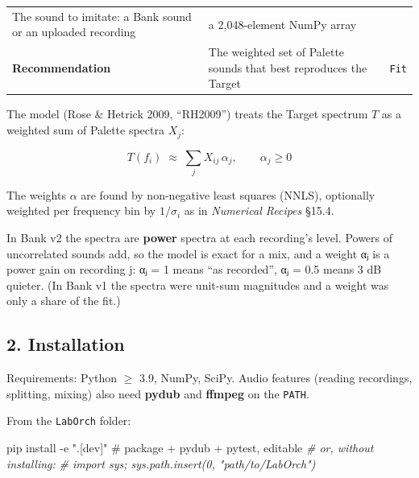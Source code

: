 \documentclass[
  10pt,
]{article}
\newenvironment{Shaded}{\begin{snugshade}}{\end{snugshade}}
\newcommand{\CommentTok}[1]{\textcolor[rgb]{0.56,0.35,0.01}{\textit{#1}}}
\newcommand{\ExtensionTok}[1]{#1}
\newcommand{\NormalTok}[1]{#1}
\newcommand{\StringTok}[1]{\textcolor[rgb]{0.31,0.60,0.02}{#1}}
\begin{document}
\begin{longtable}[]{@{}lll@{}}
\begin{minipage}[t]{0.30\columnwidth}\raggedright
The sound to imitate: a Bank sound or an uploaded
recording\strut
\end{minipage} &
\begin{minipage}[t]{0.30\columnwidth}\raggedright
a 2,048-element NumPy array\strut
\end{minipage}\tabularnewline
\begin{minipage}[t]{0.30\columnwidth}\raggedright
\textbf{Recommendation}\strut
\end{minipage} &
\begin{minipage}[t]{0.30\columnwidth}\raggedright
The weighted set of Palette sounds that best reproduces the
Target\strut
\end{minipage} &
\begin{minipage}[t]{0.30\columnwidth}\raggedright
\texttt{Fit}\strut
\end{minipage}\tabularnewline
\bottomrule
\end{longtable}

The model (Rose \& Hetrick 2009, ``RH2009'') treats the
Target spectrum $T$ as a weighted sum of Palette
spectra $X_j$:

\[
  T(f_i) \;\approx\; \sum_j X_{ij}\,\alpha_j, \qquad \alpha_j \ge 0
\]

The weights $\alpha$ are found by non-negative least squares
(NNLS), optionally weighted per frequency bin by $1/\sigma_i$ as in
\emph{Numerical Recipes} §15.4.

In Bank v2 the spectra are \textbf{power} spectra at each
recording's level. Powers of uncorrelated sounds add, so the
model is exact for a mix, and a weight αⱼ is a power gain on
recording j: αⱼ = 1 means ``as recorded'', αⱼ = 0.5 means 3
dB quieter. (In Bank v1 the spectra were unit-sum magnitudes
and a weight was only a share of the fit.)

\subsection{2. Installation}

Requirements: Python $\ge$ 3.9, NumPy, SciPy. Audio features
(reading recordings, splitting, mixing) also need
\textbf{pydub} and \textbf{ffmpeg} on the \texttt{PATH}.

From the \texttt{LabOrch} folder:

\begin{Shaded}
\begin{Highlighting}[]
\ExtensionTok{pip}\NormalTok{ install {-}e }\StringTok{".[dev]"}\NormalTok{     \# package + pydub + pytest, editable}
\CommentTok{\# or, without installing:}
\CommentTok{\#   import sys; sys.path.insert(0, "path/to/LabOrch")}
\end{Highlighting}
\end{Shaded}
\end{document}
